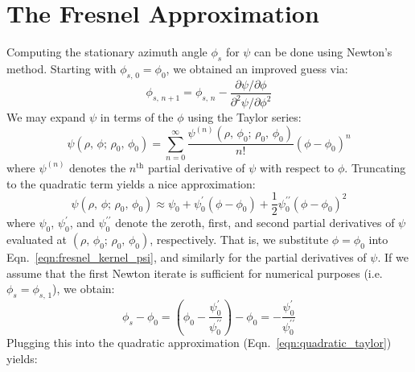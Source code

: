 \documentclass{article}
\theoremstyle{plain}
\begin{document}
    \section{The Fresnel Approximation}
        Computing the stationary azimuth angle $\phi_{s}$ for $\psi$ can be
        done using Newton's method. Starting with
        $\phi_{s,\,0}=\phi_{0}$, we obtained an improved guess via:
        \begin{equation}
            \phi_{s,\,n+1}=\phi_{s,\,n}-
            \frac{\partial\psi/\partial\phi}
                 {\partial^{2}\psi/\partial\phi^{2}}
        \end{equation}
        We may expand $\psi$ in terms of the $\phi$ using the Taylor
        series:
        \begin{equation}
            \psi(\rho,\,\phi;\,\rho_{0},\,\phi_{0})
            =\sum_{n=0}^{\infty}
                \frac{\psi^{(n)}(\rho,\,\phi_{0};\,\rho_{0},\,\phi_{0})}{n!}
                (\phi-\phi_{0})^{n}
        \end{equation}
        where $\psi^{(n)}$ denotes the $n^{\textrm{th}}$ partial derivative of
        $\psi$ with respect to $\phi$. Truncating to the quadratic term yields
        a nice approximation:
        \begin{equation}
            \label{eqn:quadratic_taylor}
            \psi(\rho,\,\phi;\,\rho_{0},\,\phi_{0})
            \approx
            \psi_{0}+\psi^{\prime}_{0}(\phi-\phi_{0})
            +\frac{1}{2}\psi^{\prime\prime}_{0}(\phi-\phi_{0})^{2}
        \end{equation}
        where $\psi_{0}$, $\psi^{\prime}_{0}$, and $\psi^{\prime\prime}_{0}$
        denote the zeroth, first, and second partial derivatives of $\psi$
        evaluated at $(\rho,\,\phi_{0};\,\rho_{0},\,\phi_{0})$, respectively.
        That is, we substitute $\phi=\phi_{0}$ into
        Eqn.~\ref{eqn:fresnel_kernel_psi}, and similarly for the partial
        derivatives of $\psi$.
        If we assume that the first Newton iterate is sufficient for numerical
        purposes (i.e. $\phi_{s}=\phi_{s,\,1}$), we obtain:
        \begin{equation}
            \phi_{s}-\phi_{0}
            =\left(
                \phi_{0}-
                \frac{\psi^{\prime}_{0}}{\psi^{\prime\prime}_{0}}
            \right)-\phi_{0}
            =-\frac{\psi^{\prime}_{0}}{\psi^{\prime\prime}_{0}}
        \end{equation}
        Plugging this into the quadratic approximation
        (Eqn.~\ref{eqn:quadratic_taylor}) yields:
\end{document}
